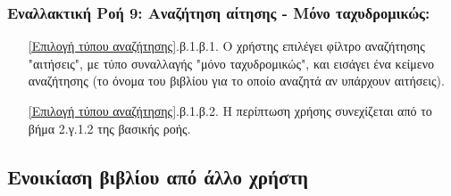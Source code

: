 \documentclass[12pt,a4paper]{article}
\begin{document}
\subsubsection*{Εναλλακτική Ροή 9: Αναζήτηση αίτησης - Μόνο ταχυδρομικώς:}
\begin{enumerate}
    \item[\ref{Επιλογή τύπου αναζήτησης}.β.1.β.1.] Ο χρήστης επιλέγει φίλτρο αναζήτησης "αιτήσεις", με τύπο συναλλαγής "μόνο ταχυδρομικώς", και εισάγει ένα κείμενο αναζήτησης (το όνομα του βιβλίου για το οποίο αναζητά αν υπάρχουν αιτήσεις).
    \item[\ref{Επιλογή τύπου αναζήτησης}.β.1.β.2.] Η περίπτωση χρήσης συνεχίζεται από το βήμα 2.γ.1.2 της βασικής ροής.
\end{enumerate}


\subsection{Ενοικίαση βιβλίου από άλλο χρήστη}
\end{document}
